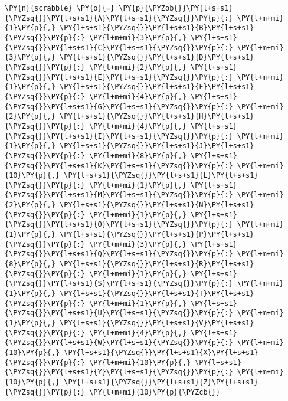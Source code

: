 \documentclass[12pt]{book}
\begin{document}
    \begin{tcolorbox}[breakable, size=fbox, boxrule=1pt, pad at break*=1mm,colback=cellbackground, colframe=cellborder]
\begin{Verbatim}[commandchars=\\\{\}]
\PY{n}{scrabble} \PY{o}{=} \PY{p}{\PYZob{}}\PY{l+s+s1}{\PYZsq{}}\PY{l+s+s1}{A}\PY{l+s+s1}{\PYZsq{}}\PY{p}{:} \PY{l+m+mi}{1}\PY{p}{,} \PY{l+s+s1}{\PYZsq{}}\PY{l+s+s1}{B}\PY{l+s+s1}{\PYZsq{}}\PY{p}{:} \PY{l+m+mi}{3}\PY{p}{,} \PY{l+s+s1}{\PYZsq{}}\PY{l+s+s1}{C}\PY{l+s+s1}{\PYZsq{}}\PY{p}{:} \PY{l+m+mi}{3}\PY{p}{,} \PY{l+s+s1}{\PYZsq{}}\PY{l+s+s1}{D}\PY{l+s+s1}{\PYZsq{}}\PY{p}{:} \PY{l+m+mi}{2}\PY{p}{,} \PY{l+s+s1}{\PYZsq{}}\PY{l+s+s1}{E}\PY{l+s+s1}{\PYZsq{}}\PY{p}{:} \PY{l+m+mi}{1}\PY{p}{,} \PY{l+s+s1}{\PYZsq{}}\PY{l+s+s1}{F}\PY{l+s+s1}{\PYZsq{}}\PY{p}{:} \PY{l+m+mi}{4}\PY{p}{,} \PY{l+s+s1}{\PYZsq{}}\PY{l+s+s1}{G}\PY{l+s+s1}{\PYZsq{}}\PY{p}{:} \PY{l+m+mi}{2}\PY{p}{,} \PY{l+s+s1}{\PYZsq{}}\PY{l+s+s1}{H}\PY{l+s+s1}{\PYZsq{}}\PY{p}{:} \PY{l+m+mi}{4}\PY{p}{,} \PY{l+s+s1}{\PYZsq{}}\PY{l+s+s1}{I}\PY{l+s+s1}{\PYZsq{}}\PY{p}{:} \PY{l+m+mi}{1}\PY{p}{,} \PY{l+s+s1}{\PYZsq{}}\PY{l+s+s1}{J}\PY{l+s+s1}{\PYZsq{}}\PY{p}{:} \PY{l+m+mi}{8}\PY{p}{,} \PY{l+s+s1}{\PYZsq{}}\PY{l+s+s1}{K}\PY{l+s+s1}{\PYZsq{}}\PY{p}{:} \PY{l+m+mi}{10}\PY{p}{,} \PY{l+s+s1}{\PYZsq{}}\PY{l+s+s1}{L}\PY{l+s+s1}{\PYZsq{}}\PY{p}{:} \PY{l+m+mi}{1}\PY{p}{,} \PY{l+s+s1}{\PYZsq{}}\PY{l+s+s1}{M}\PY{l+s+s1}{\PYZsq{}}\PY{p}{:} \PY{l+m+mi}{2}\PY{p}{,} \PY{l+s+s1}{\PYZsq{}}\PY{l+s+s1}{N}\PY{l+s+s1}{\PYZsq{}}\PY{p}{:} \PY{l+m+mi}{1}\PY{p}{,} \PY{l+s+s1}{\PYZsq{}}\PY{l+s+s1}{O}\PY{l+s+s1}{\PYZsq{}}\PY{p}{:} \PY{l+m+mi}{1}\PY{p}{,} \PY{l+s+s1}{\PYZsq{}}\PY{l+s+s1}{P}\PY{l+s+s1}{\PYZsq{}}\PY{p}{:} \PY{l+m+mi}{3}\PY{p}{,} \PY{l+s+s1}{\PYZsq{}}\PY{l+s+s1}{Q}\PY{l+s+s1}{\PYZsq{}}\PY{p}{:} \PY{l+m+mi}{8}\PY{p}{,} \PY{l+s+s1}{\PYZsq{}}\PY{l+s+s1}{R}\PY{l+s+s1}{\PYZsq{}}\PY{p}{:} \PY{l+m+mi}{1}\PY{p}{,} \PY{l+s+s1}{\PYZsq{}}\PY{l+s+s1}{S}\PY{l+s+s1}{\PYZsq{}}\PY{p}{:} \PY{l+m+mi}{1}\PY{p}{,} \PY{l+s+s1}{\PYZsq{}}\PY{l+s+s1}{T}\PY{l+s+s1}{\PYZsq{}}\PY{p}{:} \PY{l+m+mi}{1}\PY{p}{,} \PY{l+s+s1}{\PYZsq{}}\PY{l+s+s1}{U}\PY{l+s+s1}{\PYZsq{}}\PY{p}{:} \PY{l+m+mi}{1}\PY{p}{,} \PY{l+s+s1}{\PYZsq{}}\PY{l+s+s1}{V}\PY{l+s+s1}{\PYZsq{}}\PY{p}{:} \PY{l+m+mi}{4}\PY{p}{,} \PY{l+s+s1}{\PYZsq{}}\PY{l+s+s1}{W}\PY{l+s+s1}{\PYZsq{}}\PY{p}{:} \PY{l+m+mi}{10}\PY{p}{,} \PY{l+s+s1}{\PYZsq{}}\PY{l+s+s1}{X}\PY{l+s+s1}{\PYZsq{}}\PY{p}{:} \PY{l+m+mi}{10}\PY{p}{,} \PY{l+s+s1}{\PYZsq{}}\PY{l+s+s1}{Y}\PY{l+s+s1}{\PYZsq{}}\PY{p}{:} \PY{l+m+mi}{10}\PY{p}{,} \PY{l+s+s1}{\PYZsq{}}\PY{l+s+s1}{Z}\PY{l+s+s1}{\PYZsq{}}\PY{p}{:} \PY{l+m+mi}{10}\PY{p}{\PYZcb{}}
\end{Verbatim}
\end{tcolorbox}
\end{document}

